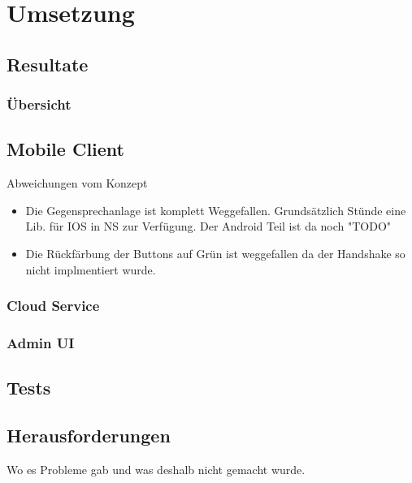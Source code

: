 \section{Umsetzung}\label{sec:umsetzung}

\subsection{Resultate}

\subsubsection{Übersicht}

\subsection{Mobile Client}\label{subsec:mobile-client-realisation}
Abweichungen vom Konzept
\begin{itemize}
    \item Die Gegensprechanlage ist komplett Weggefallen.
    \subitem Grundsätzlich Stünde eine Lib. für IOS in NS zur Verfügung. Der Android Teil ist da noch "TODO"
    \item Die Rückfärbung der Buttons auf Grün ist weggefallen da der Handshake so nicht implmentiert wurde.
\end{itemize}

\subsubsection{Cloud Service}

\subsubsection{Admin UI}

\subsection{Tests}

\subsection{Herausforderungen}

Wo es Probleme gab und was deshalb nicht gemacht wurde.







